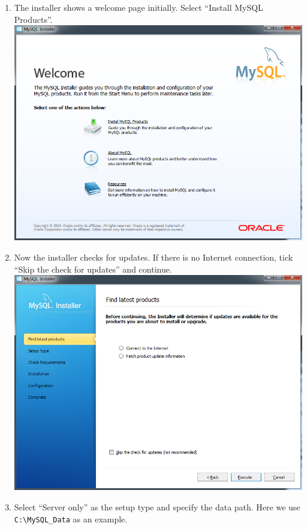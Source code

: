 \begin{enumerate}
\def\labelenumi{\arabic{enumi}.}
\itemsep1pt\parskip0pt
\item
  The installer shows a welcome page initially. Select ``Install MySQL
  Products''. \includegraphics{../img/mysql_1.png}
\item
  Now the installer checks for updates. If there is no Internet
  connection, tick ``Skip the check for updates'' and continue.
  \includegraphics{../img/mysql_2.png}
\item
  Select ``Server only'' as the setup type and specify the data path.
  Here we use \texttt{C:\textbackslash{}MySQL\_Data} as an example.

\end{enumerate}
